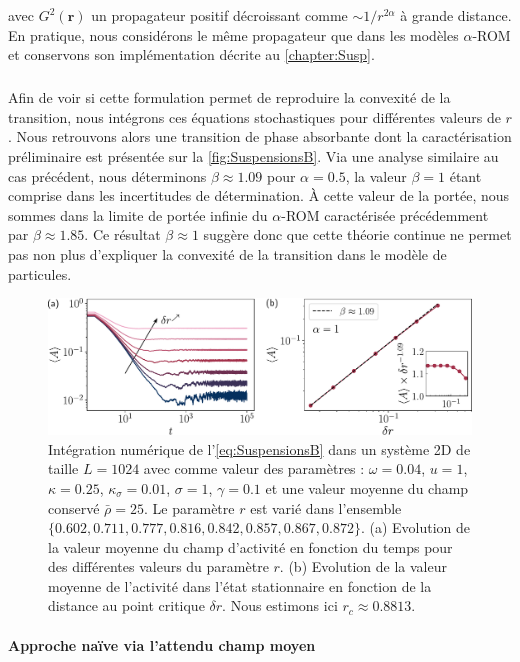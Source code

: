 \noindent avec $G^2(\mathbf{r})$ un propagateur positif décroissant comme $\sim 1/r^{2\alpha}$ à grande distance. En pratique, nous considérons le même propagateur que dans les modèles $\alpha$-ROM et conservons son implémentation décrite au \autoref{chapter:Susp}.

\subparagraph{}Afin de voir si cette formulation permet de reproduire la convexité de la transition, nous intégrons ces équations stochastiques pour différentes valeurs de $r$. Nous retrouvons alors une transition de phase absorbante dont la caractérisation préliminaire est présentée sur la \autoref{fig:SuspensionsB}. Via une analyse similaire au cas précédent, nous déterminons $\beta \approx 1.09$ pour $\alpha = 0.5$, la valeur $\beta = 1$ étant comprise dans les incertitudes de détermination. \`A cette valeur de la portée, nous sommes dans la limite de portée infinie du $\alpha$-ROM caractérisée précédemment par $\beta \approx 1.85$. Ce résultat $\beta \approx 1$ suggère donc que cette théorie continue ne permet pas non plus d'expliquer la convexité de la transition dans le modèle de particules.

\begin{figure}[h]
	\centering
	\includegraphics[width=\textwidth]{Chapitre5/Figures/SuspensionsB.pdf}
	\caption{Intégration numérique de l'\autoref{eq:SuspensionsB} dans un système 2D de taille $L=1024$ avec comme valeur des paramètres : $\omega = 0.04$, $u = 1$, $\kappa = 0.25$, $\kappa_\sigma = 0.01$, $\sigma = 1$, $\gamma = 0.1$ et une valeur moyenne du champ conservé $\bar{\rho} = 25$. Le paramètre $r$ est varié dans l'ensemble $\{ 0.602, 0.711, 0.777, 0.816, 0.842, 0.857, 0.867, 0.872\}$. (a) Evolution de la valeur moyenne du champ d'activité en fonction du temps pour des différentes valeurs du paramètre $r$. (b) Evolution de la valeur moyenne de l'activité dans l'état stationnaire en fonction de la distance au point critique $\delta r$. Nous estimons ici $r_c \approx 0.8813$.}
	\label{fig:SuspensionsB}
\end{figure}

\paragraph{Approche naïve via l'attendu champ moyen}

